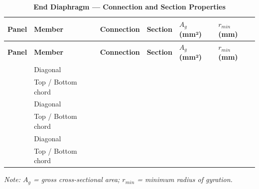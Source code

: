 \documentclass[12pt,a4paper]{report}
\numberwithin{table}{chapter}
\numberwithin{figure}{chapter}
\begin{document}
\begin{longtable}{|C{2.0cm}|L{2.0cm}|L{2.2cm}|C{2.5cm}|C{2.0cm}|C{2.0cm}|}
\caption{\textbf{End Diaphragm --- Connection and Section Properties}}
\hline
{} \textbf{Panel} & \textbf{Member} & \textbf{Connection} & \textbf{Section} & \textbf{$A_g$ (mm²)} & \textbf{$r_{min}$ (mm)} \\[6pt]
\hline
\endfirsthead
\hline
{} \textbf{Panel} & \textbf{Member} & \textbf{Connection} & \textbf{Section} & \textbf{$A_g$ (mm²)} & \textbf{$r_{min}$ (mm)} \\[6pt]
\hline
\endhead
{} & Diagonal &  &  &  &  \\[6pt]
 & Top / Bottom chord &  &  &  &  \\[6pt]
\hline
{} & Diagonal &  &  &  &  \\[6pt]
 & Top / Bottom chord &  &  &  &  \\[6pt]
\hline
{} & Diagonal &  &  &  &  \\[6pt]
 & Top / Bottom chord &  &  &  &  \\[6pt]
\hline
\end{longtable}
\noindent\textit{Note: $A_g$ = gross cross-sectional area; $r_{min}$ = minimum radius of gyration.}
\end{document}
